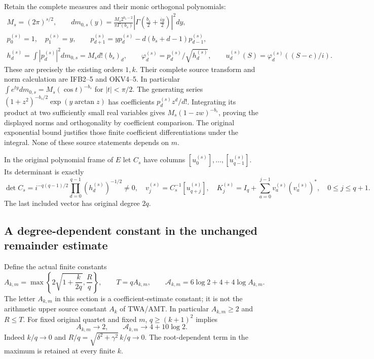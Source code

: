 \documentclass[11pt,a4paper]{article}
\begin{document}
Retain the complete measures and their monic orthogonal polynomials:
\[
\begin{gathered}
 M_s=(2\pi)^{s/2},\qquad
 dm_{0,s}(y)=\frac{M_s2^{b_s-2}}{\pi\Gamma(b_s)}
       \left|\Gamma\left(\frac{b_s}{2}+\frac{iy}{2}\right)\right|^2dy,\\
 p_0^{(s)}=1,\quad p_1^{(s)}=y,\qquad
 p_{d+1}^{(s)}=yp_d^{(s)}-d(b_s+d-1)p_{d-1}^{(s)},\\
 h_d^{(s)}=\int|p_d^{(s)}|^2dm_{0,s}=M_s d!(b_s)_d,\qquad
 \varphi_d^{(s)}=p_d^{(s)}/\sqrt{h_d^{(s)}},\qquad
 u_d^{(s)}(S)=\varphi_d^{(s)}((S-c)/i).
\end{gathered}\tag{KAF4}
\]
These are precisely the existing orders $1,k$. Their complete source
transform and norm calculation are IFB2--5 and OKV4--5. In particular
$\int e^{ty}dm_{0,s}=M_s(\cos t)^{-b_s}$ for $|t|<\pi/2$.
The generating series
$(1+z^2)^{-b_s/2}\exp(y\arctan z)$ has coefficients
$p_d^{(s)}z^d/d!$. Integrating its product at two sufficiently small
real variables gives $M_s(1-zw)^{-b_s}$, proving the displayed norms
and orthogonality by coefficient comparison. The original exponential
bound justifies those finite coefficient differentiations under the
integral. None of these source statements depends on $m$.

In the original polynomial frame of $E$ let $C_s$ have columns
$[u_0^{(s)}],\ldots,[u_{q-1}^{(s)}]$. Its determinant is exactly
\[
 \det C_s=i^{-q(q-1)/2}\prod_{d=0}^{q-1}(h_d^{(s)})^{-1/2}\ne0,
 \quad v_j^{(s)}=C_s^{-1}[u_{q+j}^{(s)}],\quad
 K_j^{(s)}=I_q+\sum_{a=0}^{j-1}v_a^{(s)}(v_a^{(s)})^*,
 \quad0\le j\le q+1.\tag{KAF5}
\]
The last included vector has original degree $2q$.

\subsection{A degree-dependent constant in the unchanged remainder estimate}
Define the actual finite constants
\[
 A_{k,m}=\max\left\{2\sqrt{1+\frac{k}{2q}},\frac{R}{q}\right\},
 \qquad T=qA_{k,m},\qquad
 \mathcal A_{k,m}=6\log2+4+4\log A_{k,m}.
 \tag{KAF6}
\]
The letter $A_{k,m}$ in this section is a coefficient-estimate constant;
it is not the arithmetic upper source constant $A_k$ of TWA/AMT.
In particular $A_{k,m}\ge2$ and $R\le T$. For fixed original quartet
and fixed $m$, $q\ge(k+1)^2$ implies
\[
 A_{k,m}\longrightarrow2,\qquad
 \mathcal A_{k,m}\longrightarrow4+10\log2.
 \tag{KAF7}
\]
Indeed $k/q\to0$ and $R/q=\sqrt{\delta^2+\gamma^2}\,k/q\to0$.
The root-dependent term in the maximum is retained at every finite $k$.
\end{document}
